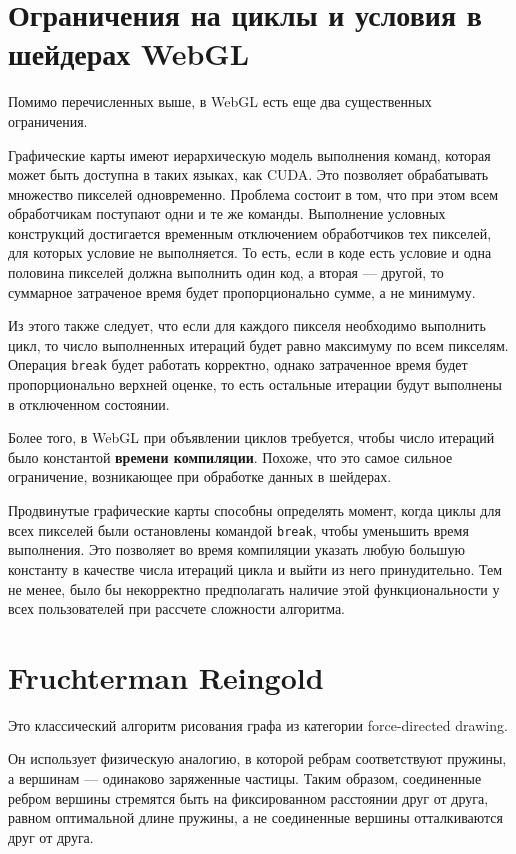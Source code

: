\section{Ограничения на циклы и условия в шейдерах WebGL}

Помимо перечисленных выше, в WebGL есть еще два существенных ограничения.

Графические карты имеют иерархическую модель выполнения команд, которая может быть доступна в таких языках, как CUDA. Это позволяет обрабатывать множество пикселей одновременно. Проблема состоит в том, что при этом всем обработчикам поступают одни и те же команды. Выполнение условных конструкций достигается временным отключением обработчиков тех пикселей, для которых условие не выполняется. То есть, если в коде есть условие и одна половина пикселей должна выполнить один код, а вторая --- другой, то суммарное затраченое время будет пропорционально сумме, а не минимуму.

Из этого также следует, что если для каждого пикселя необходимо выполнить цикл, то число выполненных итераций будет равно максимуму по всем пикселям. Операция \texttt{break} будет работать корректно, однако затраченное время будет пропорционально верхней оценке, то есть остальные итерации будут выполнены в отключенном состоянии.

Более того, в WebGL при объявлении циклов требуется, чтобы число итераций было константой {\bfseries времени компиляции}. Похоже, что это самое сильное ограничение, возникающее при обработке данных в шейдерах.

Продвинутые графические карты способны определять момент, когда циклы для всех пикселей были остановлены командой \texttt{break}, чтобы уменьшить время выполнения. Это позволяет во время компиляции указать любую большую константу в качестве числа итераций цикла и выйти из него принудительно. Тем не менее, было бы некорректно предполагать наличие этой функциональности у всех пользователей при рассчете сложности алгоритма.

\section{Fruchterman Reingold}

Это классический алгоритм рисования графа из категории force-directed drawing.

Он использует физическую аналогию, в которой ребрам соответствуют пружины, а вершинам --- одинаково заряженные частицы. Таким образом, соединенные ребром вершины стремятся быть на фиксированном расстоянии друг от друга, равном оптимальной длине пружины, а не соединенные вершины отталкиваются друг от друга.

